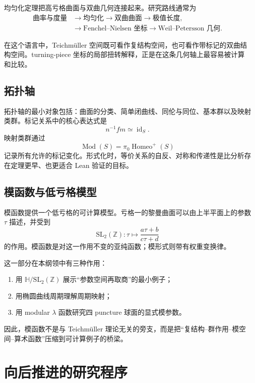 \documentclass[UTF8,fontset=none,a4paper,11pt]{ctexart}
\begin{document}
均匀化定理把高亏格曲面与双曲几何连接起来。研究路线通常为
\[
\begin{aligned}
\text{曲率与度量}
&\to \text{均匀化}
\to \text{双曲曲面}
\to \text{极值长度},\\
&\to \text{Fenchel--Nielsen 坐标}
\to \text{Weil--Petersson 几何}.
\end{aligned}
\]

在这个语言中，Teichmüller 空间既可看作复结构空间，也可看作带标记的双曲结构空间。turning-piece 坐标的局部扭转解释，正是在这条几何轴上最容易被计算和比较。

\subsection{拓扑轴}

拓扑轴的最小对象包括：曲面的分类、简单闭曲线、同伦与同位、基本群以及映射类群。标记关系中的核心表达式是
\[
  n^{-1}fm\simeq\operatorname{id}_S.
\]
映射类群通过
\[
  \operatorname{Mod}(S)=\pi_0\operatorname{Homeo}^+(S)
\]
记录所有允许的标记变化。形式化时，等价关系的自反、对称和传递性是比分析存在定理更早、也更适合 Lean 验证的目标。

\subsection{模函数与低亏格模型}

模函数提供一个低亏格的可计算模型。亏格一的黎曼曲面可以由上半平面上的参数 $\tau$ 描述，并受到
\[
  \mathrm{SL}_2(\mathbb Z):\tau\longmapsto\frac{a\tau+b}{c\tau+d}
\]
的作用。模函数是对这一作用不变的亚纯函数；模形式则带有权重变换律。

这一部分在本纲领中有三种作用：

\begin{enumerate}[label=(\arabic*)]
  \item 用 $\mathbb H/\mathrm{SL}_2(\mathbb Z)$ 展示“参数空间再取商”的最小例子；
  \item 用椭圆曲线周期理解周期映射；
  \item 用 modular $\lambda$ 函数研究四 puncture 球面的显式模参数。
\end{enumerate}

因此，模函数不是与 Teichmüller 理论无关的旁支，而是把“复结构--群作用--模空间--算术函数”压缩到可计算例子的桥梁。

\section{向后推进的研究程序}
\end{document}
